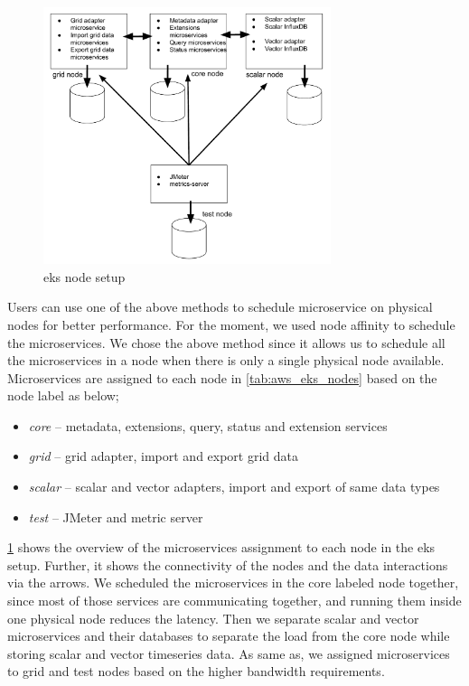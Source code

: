 \begin{figure}[htp]
    \centering
    \includegraphics[width=0.75\textwidth]{results/work_load/eks_node_setup.pdf}
    \caption{\acrfull{eks} node setup}
    \label{fi:eks_node_setup}
\end{figure}

Users can use one of the above methods to schedule microservice on physical nodes for better performance. For the moment, we used node affinity to schedule the microservices. We chose the above method since it allows us to schedule all the microservices in a node when there is only a single physical node available. Microservices are assigned to each node in \cref{tab:aws_eks_nodes} based on the node label as below;
\begin{itemize}
    \item \emph{core} -- metadata, extensions, query, status and extension services
    \item \emph{grid} -- grid adapter, import and export grid data
    \item \emph{scalar} -- scalar and vector adapters, import and export of same data types
    \item \emph{test} --  JMeter and metric server
\end{itemize}
\cref{fi:eks_node_setup} shows the overview of the microservices assignment to each node in the \acrshort{eks} setup. Further, it shows the connectivity of the nodes and the data interactions via the arrows. We scheduled the microservices in the core labeled node together, since most of those services are communicating together, and running them inside one physical node reduces the latency. Then we separate scalar and vector microservices and their databases to separate the load from the core node while storing scalar and vector timeseries data. As same as, we assigned microservices to grid and test nodes based on the higher bandwidth requirements.
